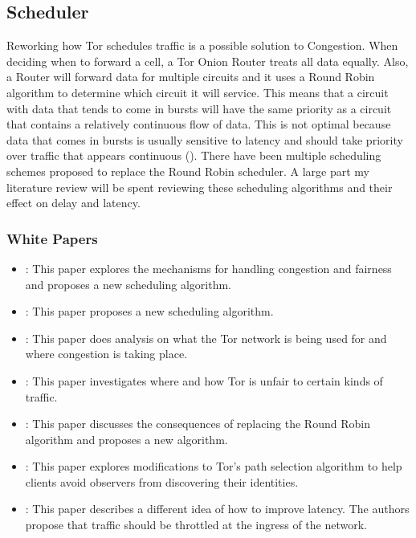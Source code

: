 \documentclass[letterpaper,13pt]{texMemo}
\begin{document}
    \subsection*{Scheduler}
    Reworking how Tor schedules traffic is a possible solution to Congestion. When deciding when to
    forward a cell, a Tor Onion Router treats all data equally. Also, a Router will forward data for
    multiple circuits and it uses a Round Robin algorithm to determine which circuit it will
    service. This means that a circuit with data that tends to come in bursts will have the same
    priority as a circuit that contains a relatively continuous flow of data. This is not
    optimal because data that comes in bursts is usually sensitive to latency and should take
    priority over traffic that appears continuous (\citeauthor[2]{unfair}). There have been
    multiple scheduling schemes proposed to replace the Round Robin scheduler. A large part my literature
    review will be spent reviewing these scheduling algorithms and their effect on delay and latency.

\subsubsection*{White Papers}
\begin{itemize}
    \item
    \citeauthor*{unfair}: This paper explores the mechanisms for handling congestion
    and fairness and proposes a new scheduling algorithm.
    \item
    \citeauthor*{Tang}: This paper proposes a new scheduling algorithm.
    \item
    \citeauthor*{analysis}: This paper does analysis on what the Tor network is being used for and where congestion is taking place.
    \item
    \citeauthor*{delay}: This paper investigates where and how Tor is unfair to certain kinds of traffic.
    \item
    \citeauthor*{Bauer}: This paper discusses the consequences of replacing the Round Robin algorithm and
    proposes a new algorithm.
    \item
    \citeauthor*{Edman}: This paper explores modifications to Tor's path selection algorithm to help
    clients avoid observers from discovering their identities.
    \item
    \citeauthor*{Moore}: This paper describes a different idea of how to improve latency. The
    authors propose that traffic should be throttled at the ingress of the network.

\end{itemize}
\end{document}

